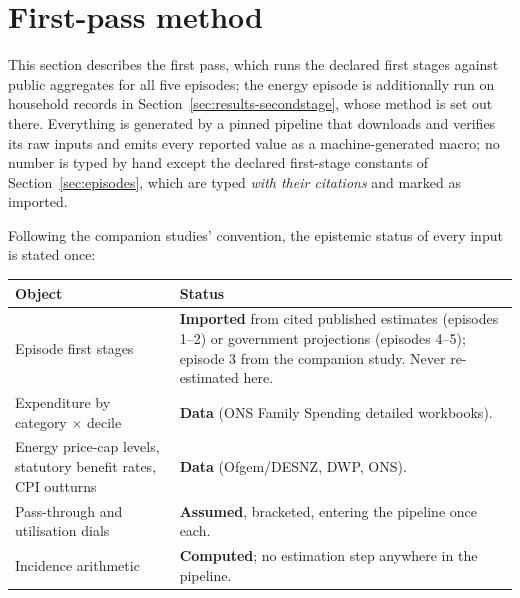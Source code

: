 \section{First-pass method}\label{sec:method}

This section describes the first pass, which runs the declared first
stages against public aggregates for all five episodes; the energy
episode is additionally run on household records in
Section~\ref{sec:results-secondstage}, whose method is set out there. Everything is generated by a pinned
pipeline that downloads and verifies its raw
inputs and emits every reported value as a machine-generated macro;
no number is typed by hand except the declared first-stage constants of
Section~\ref{sec:episodes}, which are typed \emph{with their citations}
and marked as imported.

Following the companion studies' convention, the epistemic status of
every input is stated once:

\begin{center}
\small
\begin{tabular}{P{0.30\textwidth}P{0.60\textwidth}}
\toprule
Object & Status \\
\midrule
Episode first stages & \textbf{Imported} from cited published estimates (episodes 1--2) or government projections (episodes 4--5); episode 3 from the companion study. Never re-estimated here. \\
Expenditure by category $\times$ decile & \textbf{Data} (ONS Family Spending detailed workbooks). \\
Energy price-cap levels, statutory benefit rates, CPI outturns & \textbf{Data} (Ofgem/DESNZ, DWP, ONS). \\
Pass-through and utilisation dials & \textbf{Assumed}, bracketed, entering the pipeline once each. \\
Incidence arithmetic & \textbf{Computed}; no estimation step anywhere in the pipeline. \\
\bottomrule
\end{tabular}
\end{center}

